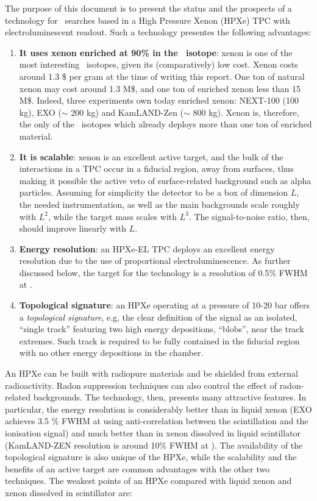 
The purpose of this document is to present the status and the prospects of a technology for \bbonu\ searches based in a High Pressure Xenon (HPXe) TPC with electroluminescent readout. Such a technology presentes the following advantages:

\begin{enumerate}
\item {\bf It uses xenon enriched at 90\% in the \XE\ isotope}: xenon is one of the most interesting \bb\ isotopes, given its (comparatively) low cost. Xenon costs around 1.3 \$ per gram at the time of writing this report. One ton of natural xenon may cost around 1.3 M\$, and one ton of enriched xenon less than 15 M\$. Indeed, three experiments own today enriched xenon: NEXT-100 (100 kg), EXO ($\sim$ 200 kg) and KamLAND-Zen ($\sim$ 800 kg). Xenon is, therefore, the only of the \bb\ isotopes which already deploys more than one ton of enriched material. 
\item {\bf It is scalable}: xenon is an excellent active target, and the bulk of the interactions in a TPC occur in a fiducial region, away from surfaces, thus making it possible the active veto of surface-related background such as alpha particles. Assuming for simplicity the detector to be a box of dimension $L$, the needed instrumentation, as well as the main backgrounds scale roughly with $L^2$, while the target mass scales with $L^3$. The signal-to-noise ratio, then, should improve linearly with $L$. 
\item {\bf Energy resolution}: an HPXe-EL TPC deploys an excellent energy resolution due to the use of proportional electroluminescence\cite{Nygren:2009zz}. As further discussed below, the target for the technology is a resolution of 0.5\% FWHM at \Qbb.
\item {\bf Topological signature}: an HPXe operating at a pressure of 10-20 bar offers a {\em topological signature}, e.g, the clear definition of the signal as an isolated, ``single track'' featuring two high energy depositions, ``blobs'', near the track extremes. Such track is required to be fully contained in the fiducial region with no other energy depositions in the chamber. 
\end{enumerate}

An HPXe can be built with radiopure materials and be shielded from external radioactivity. Radon suppression techniques can also control the effect of radon-related backgrounds. The technology, then, presents many attractive features. In particular, the energy resolution is considerably better than in liquid xenon (EXO achieves 3.5 \% FWHM  at \Qbb using anti-correlation between the scintillation and the ionisation signal) and much better than in xenon dissolved in liquid scintillator (KamLAND-ZEN resolution is around 10\% FWHM at \Qbb). The availability of the topological signature is also unique of the HPXe, while the scalability and the benefits of an active target are common advantages with the other two techniques. The weakest points of an HPXe compared with liquid xenon and xenon dissolved in scintillator are:

